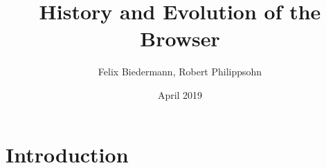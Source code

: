 \documentclass[runningheads]{llncs}
\title{History and Evolution of the Browser}
\author{Felix Biedermann, Robert Philippsohn }
\date{April 2019}
\begin{document}
\maketitle

\section{Introduction}
\end{document}

